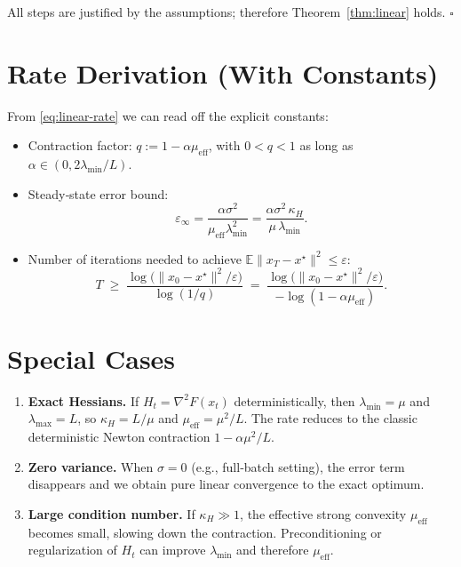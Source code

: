 \documentclass{article}
\begin{document}
\bigskip
All steps are justified by the assumptions; therefore Theorem~\ref{thm:linear} holds. \hfill $\square$

\section*{Rate Derivation (With Constants)}
From \eqref{eq:linear-rate} we can read off the explicit constants:

\begin{itemize}[leftmargin=*]
    \item Contraction factor: $q:=1-\alpha\mu_{\mathrm{eff}}$, with $0<q<1$ as long as $\alpha\in(0,2\lambda_{\min}/L)$.
    \item Steady‑state error bound:
    \[
        \varepsilon_{\infty} = \frac{\alpha\sigma^2}{\mu_{\mathrm{eff}}\lambda_{\min}^2}
        = \frac{\alpha\sigma^2\,\kappa_H}{\mu\,\lambda_{\min}} .
    \]
    \item Number of iterations needed to achieve $\mathbb{E}\|x_T-x^\star\|^2\le\varepsilon$:
    \[
        T\;\ge\;
        \frac{\log\!\big(\|x_0-x^\star\|^2/\varepsilon\big)}{\log(1/q)}
        \;=\;
        \frac{\log\!\big(\|x_0-x^\star\|^2/\varepsilon\big)}{-\log(1-\alpha\mu_{\mathrm{eff}})} .
    \]
\end{itemize}

\section*{Special Cases}
\begin{enumerate}[leftmargin=*]
    \item \textbf{Exact Hessians.} If $H_t=\nabla^2 F(x_t)$ deterministically, then $\lambda_{\min}=\mu$ and $\lambda_{\max}=L$, so $\kappa_H=L/\mu$ and $\mu_{\mathrm{eff}}=\mu^2/L$. The rate reduces to the classic deterministic Newton contraction $1-\alpha\mu^2/L$.
    \item \textbf{Zero variance.} When $\sigma=0$ (e.g., full‑batch setting), the error term disappears and we obtain pure linear convergence to the exact optimum.
    \item \textbf{Large condition number.} If $\kappa_H\gg1$, the effective strong convexity $\mu_{\mathrm{eff}}$ becomes small, slowing down the contraction. Preconditioning or regularization of $H_t$ can improve $\lambda_{\min}$ and therefore $\mu_{\mathrm{eff}}$.
\end{enumerate}
\end{document}
